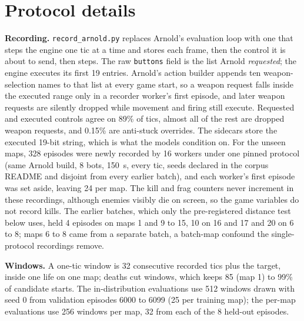 
\section{Protocol details}
\label{app:protocol}

\textbf{Recording.} \texttt{record\_arnold.py} replaces Arnold's evaluation loop with one that steps the engine one tic at a time and stores each frame, then the control it is about to send, then steps. The raw \texttt{buttons} field is the list Arnold \emph{requested}; the engine executes its first 19 entries. Arnold's action builder appends ten weapon-selection names to that list at every game start, so a weapon request falls inside the executed range only in a recorder worker's first episode, and later weapon requests are silently dropped while movement and firing still execute. Requested and executed controls agree on 89\% of tics, almost all of the rest are dropped weapon requests, and 0.15\% are anti-stuck overrides. The sidecars store the executed 19-bit string, which is what the models condition on. For the unseen maps, 328 episodes were newly recorded by 16 workers under one pinned protocol (same Arnold build, 8 bots, 150~s, every tic, seeds declared in the corpus README and disjoint from every earlier batch), and each worker's first episode was set aside, leaving 24 per map. The kill and frag counters never increment in these recordings, although enemies visibly die on screen, so the game variables do not record kills. The earlier batches, which only the pre-registered distance test below uses, held 4 episodes on maps 1 and 9 to 15, 10 on 16 and 17 and 20 on 6 to 8; maps 6 to 8 came from a separate batch, a batch-map confound the single-protocol recordings remove.

\textbf{Windows.} A one-tic window is 32 consecutive recorded tics plus the target, inside one life on one map; deaths cut windows, which keeps 85 (map 1) to 99\% of candidate starts. The in-distribution evaluations use 512 windows drawn with seed 0 from validation episodes 6000 to 6099 (25 per training map); the per-map evaluations use 256 windows per map, 32 from each of the 8 held-out episodes.

